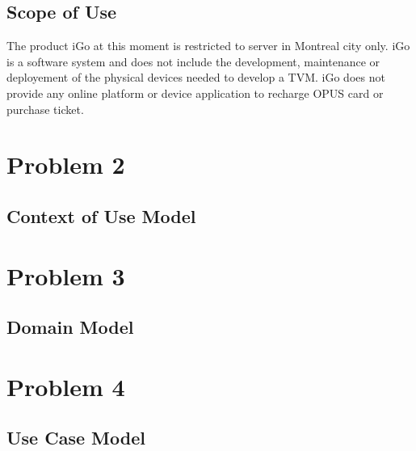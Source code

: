 \documentclass[a4paper,12pt]{report}
\begin{document}
\subsection{Scope of Use}
The product iGo at this moment is restricted to server in Montreal city only. iGo is a software system and does not include the development, maintenance or deployement of the physical devices needed to develop a TVM. iGo does not provide any online platform or device application to recharge OPUS card or purchase ticket.




\section{Problem 2}
\subsection{Context of Use Model}



\section{Problem 3}
\subsection{Domain Model}



\section{Problem 4}
\subsection{Use Case Model}








\printglossaries
\end{document}

